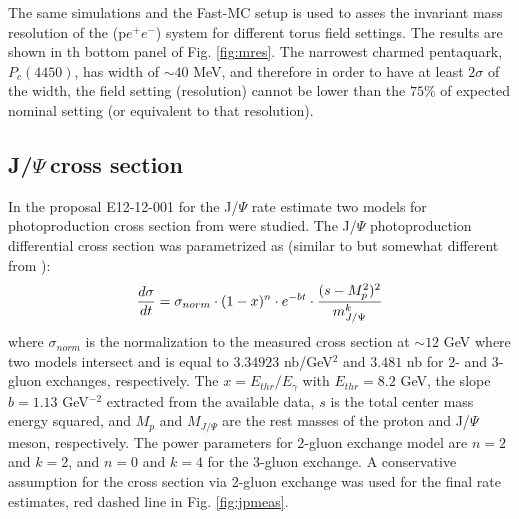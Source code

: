 \documentclass[12pt]{revtex4}
\newcommand{\JP}{J/$\Psi~$}
\begin{document}
The same simulations and the Fast-MC setup is used to asses the invariant mass resolution of the (p$e^+e^-$) system for different torus field settings. The results are shown in th bottom panel of Fig. \ref{fig:mres}. The narrowest charmed pentaquark, $P_c(4450)$, has width of $\sim 40$ MeV, and therefore in order to have at least $2\sigma$ of the width, the field setting (resolution) cannot be lower than the $75\%$ of expected nominal setting (or equivalent to that resolution).  


\clearpage

\subsection{\JP cross section}

In the proposal E12-12-001 for the J/$\Psi$ rate estimate two models for photoproduction cross section from \cite{bchl} were studied.  The J/$\Psi$ photoproduction differential cross section was parametrized as (similar to but somewhat different from \cite{bchl}):
\begin{eqnarray*}
{d\sigma\over{dt}} = \sigma_{norm}\cdot (1-x)^n\cdot e^{-bt}\cdot{(s-M_p^2)^2\over{m_{J/\Psi}^k}}
\end{eqnarray*}
where $\sigma_{norm}$ is the normalization to the measured cross section at $\sim 12$ GeV where two models intersect and is equal to $3.34923$ nb/GeV$^2$ and $3.481$ nb for 2- and 3-gluon exchanges, respectively. The $x=E_{thr}/E_\gamma$ with $E_{thr}=8.2$ GeV, the slope $b=1.13$ GeV$^{-2}$ extracted from the available data, $s$ is the total center mass energy squared, and $M_p$ and $M_{J/\Psi}$ are the rest masses of the proton and J/$\Psi$ meson, respectively. The power parameters for 2-gluon exchange model are $n=2$ and $k=2$, and $n=0$ and $k=4$ for the 3-gluon exchange. A conservative assumption for the cross section via 2-gluon exchange was used  for the final rate estimates, red dashed line in Fig. \ref{fig:jpmeas}.
\end{document}
